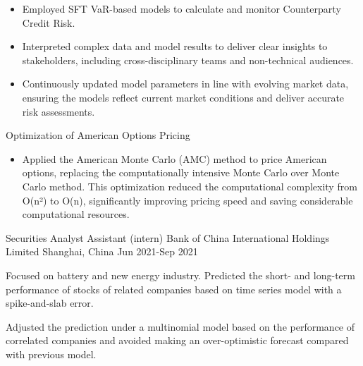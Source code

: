 \begin{cventries}
{\begin{cvitems}
\begin{itemize}
          \item Employed SFT VaR-based models to calculate and monitor Counterparty Credit Risk.
          \item Interpreted complex data and model results to deliver clear insights to stakeholders, including cross-disciplinary teams and non-technical audiences.
          \item Continuously updated model parameters in line with evolving market data, ensuring the models reflect current market conditions and deliver accurate risk assessments.
        \end{itemize}
        \item Optimization of American Options Pricing
        \begin{itemize}
          \item Applied the American Monte Carlo (AMC) method to price American options, replacing the computationally intensive Monte Carlo over Monte Carlo method. This optimization reduced the computational complexity from O(n²) to O(n), significantly improving pricing speed and saving considerable computational resources.
        \end{itemize}
      \end{cvitems}
    }


  \cventry
    {Securities Analyst Assistant (intern)} %
    {Bank of China International Holdings Limited} %
    {Shanghai, China} %
    {Jun 2021-Sep 2021} %
    {
      \begin{cvitems} %
        \item {Focused on battery and new energy industry. Predicted the short- and long-term performance of stocks of related companies based on time series model with a spike-and-slab error.}
        \item {Adjusted the prediction under a multinomial model based on the performance of correlated companies and avoided making an over-optimistic forecast compared with previous model.}
      \end{cvitems}
    }


\end{cventries}
